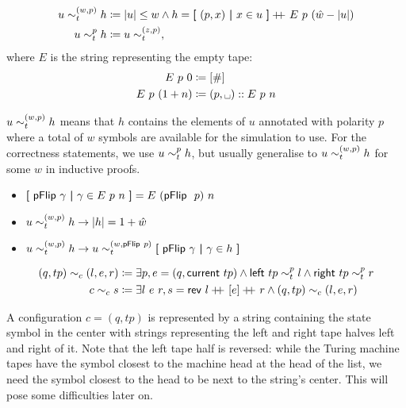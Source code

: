 \begin{definition}
  \begin{align*}
    u \sim_t^{(w, p)} h &\coloneqq |u| \le w \land h = \textbf{[}~(p, x) ~\textbf{|}~ x \in u~\textbf{]} +\kern-1.3ex+\kern0.8ex E~p~(\hat{w} - |u|)\\
  u \sim_t^{p} h &\coloneqq u \sim_t^{(z, p)}, 
  \end{align*}
  where $E$ is the string representing the empty tape:
  \begin{align*}
    \nilstr{p}{0} &\defeq [\#] \\
    \nilstr{p}{(\natS{n})} &\defeq (p, \blank) :: \nilstr{p}{n}
  \end{align*}
\end{definition}
$u \sim_t^{(w, p)} h$ means that $h$ contains the elements of $u$ annotated with polarity $p$ where a total of $w$ symbols are available for the simulation to use.
For the correctness statements, we use $u \sim_t^{p} h$, but usually generalise to $u \sim_t^{(w, p)} h$ for some $w$ in inductive proofs. 

\begin{proposition}\label{prop:tapefacts}\leavevmode
  \begin{itemize}
    \item $\textbf{[}~ \textsf{pFlip}~\gamma ~\textbf{|}~ \gamma \in E~p~n ~\textbf{]} = E~(\textsf{pFlip}~~p)~n$
    \item $u \sim_t^{(w, p)} h \rightarrow |h| = 1 +{\hat{w}}$
    \item $u \sim_t^{(w, p)} h \rightarrow u \sim_t^{(w, \textsf{pFlip}~p)} \textbf{[}~ \textsf{pFlip}~\gamma ~\textbf{|}~ \gamma \in h ~\textbf{]}$
  \end{itemize}
\end{proposition}

\begin{definition}
  \begin{align*}
    (q, tp) \sim_c{} (l, e, r) &\coloneqq \exists p, e = (q, \textsf{current}~tp) \land \textsf{left}~tp \sim_t^{p} l \land \textsf{right}~tp \sim_t^{p} r \\
    c \sim_c{} s &\coloneqq \exists l~ e~ r, s = \mathsf{rev}~{l} +\kern-1.3ex+\kern0.8ex{} [e] +\kern-1.3ex+\kern0.8ex{} r \land (q, tp) \sim_c{} (l, e, r) 
  \end{align*}
\end{definition}
A configuration $c = (q, tp)$ is represented by a string containing the state symbol in the center with strings representing the left and right tape halves left and right of it. Note that the left tape half is reversed: while the Turing machine tapes have the symbol closest to the machine head at the head of the list, we need the symbol closest to the head to be next to the string's center. This will pose some difficulties later on.

